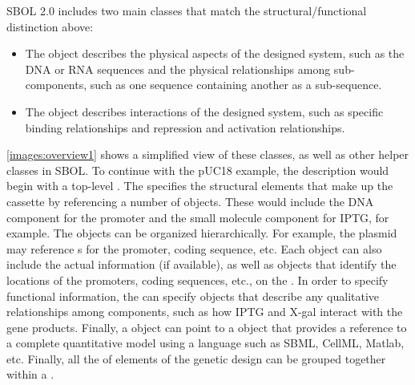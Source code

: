 SBOL 2.0 includes two main classes that match the structural/functional distinction above:
\begin{itemize}
\item The  object describes the physical aspects of the designed system, such as the DNA or RNA sequences and the physical relationships among sub-components, such as one sequence containing another as a sub-sequence.
\item The  object describes interactions of the designed system, such as specific binding relationships and repression and activation relationships. 
\end{itemize}

\ref{images:overview1} shows a simplified view of these classes, as well as other helper classes in SBOL. To continue with the pUC18 example, the description would begin with a top-level .  
The  specifies the structural elements that make up the cassette by referencing a number of  objects. These would include the DNA component for the promoter and the small molecule component for IPTG, for example.  
The  objects can be organized hierarchically.  For example, the plasmid  may reference s for the promoter, coding sequence, etc.  
Each  object can also include the actual  information (if available), as well as  objects that identify the locations of the promoters, coding sequences, etc., on the .  
In order to specify functional information, the  can specify  objects that describe any qualitative relationships among components, such as how IPTG and X-gal interact with the gene products.  Finally, a  object can point to a  object that provides a reference to a complete quantitative model using a language such as SBML, CellML, Matlab, etc.  Finally, all the of elements of the genetic design can be grouped together within a .

